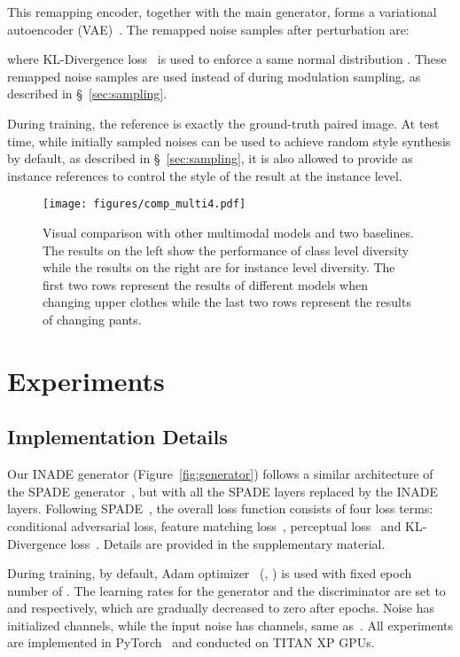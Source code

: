 \documentclass[final]{cvpr}
\begin{document}
This remapping encoder, together with the main generator, forms a variational autoencoder (VAE)~\cite{kingma2013auto}. The remapped noise samples after perturbation are:

where KL-Divergence loss~\cite{kingma2013auto} is used to enforce a same normal distribution . These remapped noise samples are used instead of  during modulation sampling, as described in \S~\ref{sec:sampling}.

During training, the reference  is exactly the ground-truth paired image. At test time, while initially sampled noises can be used to achieve random style synthesis by default, as described in \S~\ref{sec:sampling}, it is also allowed to provide  as instance references to control the style of the result at the instance level.

\begin{figure*}[tp]
  \centering
  \texttt{[image: figures/comp\_multi4.pdf]}
  \caption{Visual comparison with other multimodal models and two baselines. The results on the left show the performance of class level diversity while the results on the right are for instance level diversity. The first two rows represent the results of different models when changing upper clothes while the last two rows represent the results of changing pants. }
  \label{fig:results_multi}
\end{figure*}
\section{Experiments}
\subsection{Implementation Details}
Our INADE generator (Figure~\ref{fig:generator}) follows a similar architecture of the SPADE generator~\cite{park2019semantic}, but with all the SPADE layers replaced by the INADE layers. 
Following SPADE~\cite{park2019semantic}, the overall loss function consists of four loss terms: conditional adversarial loss, feature matching loss~\cite{wang2018high}, perceptual loss~\cite{johnson2016perceptual} and KL-Divergence loss~\cite{kingma2013auto}. Details are provided in the supplementary material.

During training, by default, Adam optimizer~\cite{kingma2015adam} (, ) is used with fixed epoch number of . The learning rates for the generator and the discriminator are set to  and  respectively, which are gradually decreased to zero after  epochs. Noise  has  initialized channels, while the input noise has  channels, same as~\cite{park2019semantic,liu2019learning}. 
All experiments are implemented in PyTorch~\cite{paszke2019pytorch} and conducted on TITAN XP GPUs.
\end{document}
